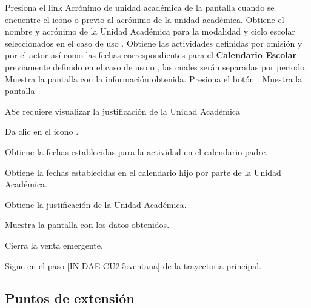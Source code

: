 
\begin{UCtrayectoria}
	\UCpaso [\UCactor] Presiona el link \underline{Acrónimo de unidad académica} de la pantalla  cuando se encuentre el icono \IUVer o \IUDone previo al acrónimo de la unidad académica.
	\UCpaso Obtiene el nombre y acrónimo de la Unidad Académica para la modalidad y ciclo escolar seleccionados en el caso de uso .
	\UCpaso \label{IN-DAE-CU2.5:mod} Obtiene las actividades definidas por omisión y por el actor así como las fechas correspondientes para el \textbf{Calendario Escolar} previamente definido en el caso de uso  o , las cuales serán separadas por periodo.
	\UCpaso \label{IN-DAE-CU2.5:ventana} Muestra la pantalla  con la información obtenida.  
	\UCpaso [\UCactor] Presiona el botón .
	\UCpaso Muestra la pantalla  
\end{UCtrayectoria}



\begin{UCtrayectoriaA}{A}{Se requiere visualizar la justificación de la Unidad Académica}
	
	
	\UCpaso [\UCactor] Da clic en el icono \IUUTematicas.
	
	\UCpaso Obtiene la fechas establecidas para la actividad en el calendario padre.
	
	\UCpaso Obtiene la fechas establecidas en el calendario hijo por parte de la Unidad Académica.
	
	\UCpaso Obtiene la justificación de la Unidad Académica. 
	
	\UCpaso Muestra la pantalla   con los datos obtenidos.
	
	\UCpaso [\UCactor] Cierra la venta emergente.
	
	\UCpaso Sigue en el paso \ref{IN-DAE-CU2.5:ventana} de la trayectoria principal.
	
\end{UCtrayectoriaA}



\subsection{Puntos de extensión}

